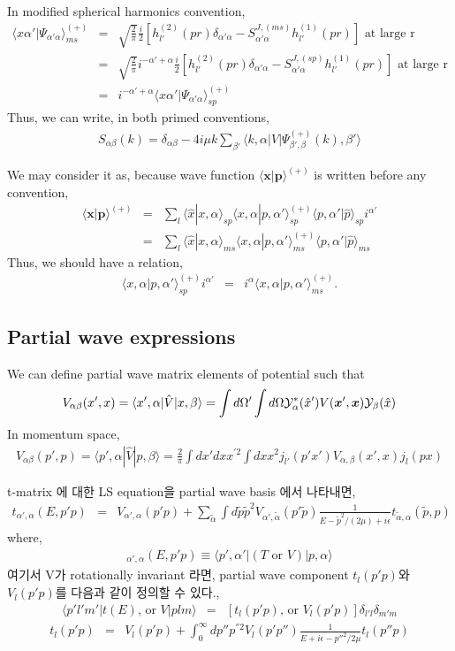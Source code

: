 \documentclass[10pt]{article}
\def\bm{\boldsymbol}
\newcommand{\bea}{\begin{eqnarray}}
\newcommand{\eea}{\end{eqnarray}}
\newcommand{\no}{\nonumber \\}
\def\vp{{\bm p}}
\def\vx{{\bm x}}
\def\la{\langle}
\def\ra{\rangle}
\begin{document}
\begin{itemize}
In modified spherical harmonics convention,
\bea
\la x \alpha'|\Psi_{\alpha'\alpha}\ra^{(+)}_{ms}
&=&\sqrt{\frac{2}{\pi}}
    \frac{i}{2}[h^{(2)}_{l'}(pr)\delta_{\alpha'\alpha}
                      -S^{J,(ms)}_{\alpha'\alpha} 
                      h^{(1)}_{l'}(pr)] 
                      \mbox{ at large r}\no
&=&\sqrt{\frac{2}{\pi}}
   i^{-\alpha'+\alpha} \frac{i}{2}
                  [h^{(2)}_{l'}(pr)\delta_{\alpha'\alpha}
                      -S^{J,(sp)}_{\alpha'\alpha} 
                      h^{(1)}_{l'}(pr)] 
                      \mbox{ at large r}\no
&=&i^{-\alpha'+\alpha}\la x \alpha'|\Psi_{\alpha'\alpha}\ra^{(+)}_{sp}
\eea
Thus, we can write, in both primed conventions,
\bea
S_{\alpha\beta}(k)=\delta_{\alpha\beta}-4i\mu k
 \sum_{\beta'}\la k, \alpha|V|\Psi^{(+)}_{\beta',\beta}(k),\beta'\ra
\eea

We may consider it as, because wave function 
$\la\vx|\vp\ra^{(+)}$ is written before any convention,
\bea
\la \vx|\vp\ra^{(+)}&=&\sum_{l}\la \hat{x}|x,\alpha\ra_{sp}
                     \la x,\alpha|p,\alpha'\ra^{(+)}_{sp}
                     \la p,\alpha'|\hat{p}\ra_{sp} i^{\alpha'}\no
                    &=&\sum_{l}\la \hat{x}|x,\alpha\ra_{ms}
                     \la x,\alpha|p,\alpha'\ra^{(+)}_{ms}
                     \la p,\alpha'|\hat{p}\ra_{ms}  
\eea
Thus, we should have a relation,
\bea
\la x,\alpha|p,\alpha'\ra^{(+)}_{sp}i^{\alpha'}
&=& i^{\alpha}\la x,\alpha|p,\alpha'\ra^{(+)}_{ms}.
\eea



\subsection{Partial wave expressions}
We can define partial wave matrix elements 
of potential such that
\bea 
V_{\alpha\beta}(x',x )
=\la x',\alpha|\hat{V}|x, \beta \ra
=\int d\Omega'\int d\Omega 
 {\cal Y}^*_{\alpha}(\hat{x}')V(\vx',\vx)
 {\cal Y}_{\beta}(\hat{x}) 
\eea 
In momentum space,
\bea 
V_{\alpha\beta}(p',p)
=\la p',\alpha|\hat{V}|p,\beta\ra 
=\frac{2}{\pi}\int d x' dx x^{'2} \int dx x^2
 j_{l'}(p' x') V_{\alpha,\beta }(x',x)
 j_{l}(px) 
\eea 

t-matrix 에 대한 LS equation을 partial wave basis 에서 나타내면, 
\bea
t_{\alpha ',\alpha}(E,p' p)
&=&V_{\alpha',\alpha}(p'p)
+\sum_{\tilde{\alpha}}\int d\tilde{p}\tilde{p}^2
 V_{\alpha',\tilde{\alpha}}(p'\tilde{p})
\frac{1}{E-\tilde{p}^2/(2\mu)+i\epsilon}
 t_{\tilde{\alpha},\alpha}(\tilde{p},p)
\eea
where,
\bea 
[t\mbox{ or } V]_{\alpha ',\alpha}(E,p' p)\equiv
\la p',\alpha'|(T\mbox{ or } V)|p,\alpha\ra
\eea
여기서 V가 rotationally invariant 라면, 
partial wave component $t_l(p'p)$와 $V_l(p'p)$를 다음과 같이 정의할 수 있다.,
\bea
\la p' l' m'|t(E)\mbox{, or }V |p l m\ra
&=&[t_l(p'p)\mbox{, or }V_l(p'p)]\delta_{l'l}\delta_{m'm}
\eea
\bea
t_l(p'p)&=&V_l(p'p)+\int_0^\infty dp'' p^{''2} V_l(p'p'')\frac{1}{E+i\epsilon-p''^2/2\mu}t_l(p''p)
\eea


\end{itemize}
\end{document}
